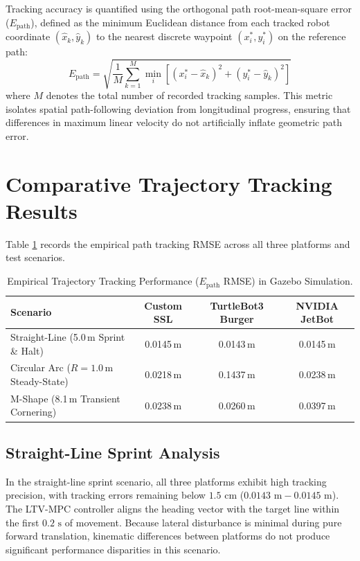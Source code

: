 \documentclass[a4paper,twoside,12pt]{report}
\begin{document}
Tracking accuracy is quantified using the orthogonal path root-mean-square error ($E_{\text{path}}$), defined as the minimum Euclidean distance from each tracked robot coordinate $(\hat{x}_k, \hat{y}_k)$ to the nearest discrete waypoint $(x_i^*, y_i^*)$ on the reference path:
\begin{equation}
E_{\text{path}} = \sqrt{\frac{1}{M} \sum_{k=1}^{M} \min_{i} \left[ (x_i^* - \hat{x}_k)^2 + (y_i^* - \hat{y}_k)^2 \right]}
\label{eq:path_rmse}
\end{equation}
where $M$ denotes the total number of recorded tracking samples. This metric isolates spatial path-following deviation from longitudinal progress, ensuring that differences in maximum linear velocity do not artificially inflate geometric path error.

\section{Comparative Trajectory Tracking Results}

Table \ref{tab:empirical_benchmarks} records the empirical path tracking RMSE across all three platforms and test scenarios.

\begin{table}[H]
\centering
\small
\caption{Empirical Trajectory Tracking Performance ($E_{\text{path}}$ RMSE) in Gazebo Simulation.}
\label{tab:empirical_benchmarks}
\begin{tabularx}{\textwidth}{Xccc}
\toprule
\textbf{Scenario} & \textbf{Custom SSL} & \textbf{TurtleBot3 Burger} & \textbf{NVIDIA JetBot} \\
\midrule
Straight-Line (5.0\,m Sprint \& Halt) & 0.0145\,m & 0.0143\,m & 0.0145\,m \\
Circular Arc ($R = 1.0$\,m Steady-State) & 0.0218\,m & 0.1437\,m & 0.0238\,m \\
M-Shape (8.1\,m Transient Cornering) & 0.0238\,m & 0.0260\,m & 0.0397\,m \\
\bottomrule
\end{tabularx}
\end{table}

\subsection{Straight-Line Sprint Analysis}
In the straight-line sprint scenario, all three platforms exhibit high tracking precision, with tracking errors remaining below $1.5\text{ cm}$ ($0.0143\text{ m} - 0.0145\text{ m}$). The LTV-MPC controller aligns the heading vector with the target line within the first $0.2\text{ s}$ of movement. Because lateral disturbance is minimal during pure forward translation, kinematic differences between platforms do not produce significant performance disparities in this scenario.
\end{document}
